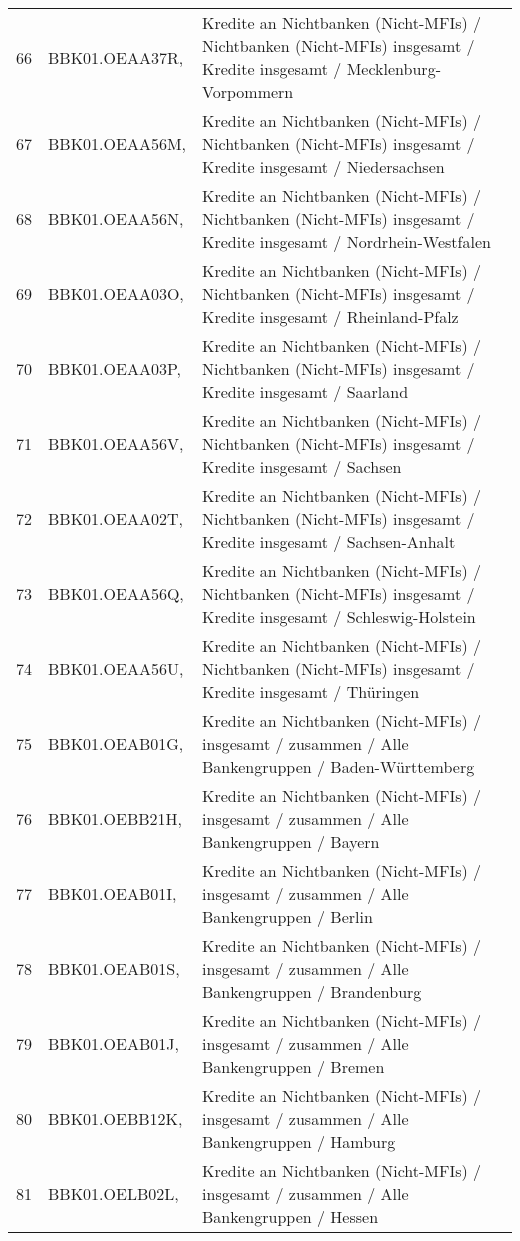 \begin{table}[ht]
\begin{tabular}{rll}
  66 & BBK01.OEAA37R, & Kredite an Nichtbanken (Nicht-MFIs) / Nichtbanken (Nicht-MFIs) insgesamt / Kredite insgesamt / Mecklenburg-Vorpommern \\ 
  67 & BBK01.OEAA56M, & Kredite an Nichtbanken (Nicht-MFIs) / Nichtbanken (Nicht-MFIs) insgesamt / Kredite insgesamt / Niedersachsen \\ 
  68 & BBK01.OEAA56N, & Kredite an Nichtbanken (Nicht-MFIs) / Nichtbanken (Nicht-MFIs) insgesamt / Kredite insgesamt / Nordrhein-Westfalen \\ 
  69 & BBK01.OEAA03O, & Kredite an Nichtbanken (Nicht-MFIs) / Nichtbanken (Nicht-MFIs) insgesamt / Kredite insgesamt / Rheinland-Pfalz \\ 
  70 & BBK01.OEAA03P, & Kredite an Nichtbanken (Nicht-MFIs) / Nichtbanken (Nicht-MFIs) insgesamt / Kredite insgesamt / Saarland \\ 
  71 & BBK01.OEAA56V, & Kredite an Nichtbanken (Nicht-MFIs) / Nichtbanken (Nicht-MFIs) insgesamt / Kredite insgesamt / Sachsen \\ 
  72 & BBK01.OEAA02T, & Kredite an Nichtbanken (Nicht-MFIs) / Nichtbanken (Nicht-MFIs) insgesamt / Kredite insgesamt / Sachsen-Anhalt \\ 
  73 & BBK01.OEAA56Q, & Kredite an Nichtbanken (Nicht-MFIs) / Nichtbanken (Nicht-MFIs) insgesamt / Kredite insgesamt / Schleswig-Holstein \\ 
  74 & BBK01.OEAA56U, & Kredite an Nichtbanken (Nicht-MFIs) / Nichtbanken (Nicht-MFIs) insgesamt / Kredite insgesamt / Thüringen \\ 
  75 & BBK01.OEAB01G, & Kredite an Nichtbanken (Nicht-MFIs) / insgesamt / zusammen / Alle Bankengruppen / Baden-Württemberg \\ 
  76 & BBK01.OEBB21H, & Kredite an Nichtbanken (Nicht-MFIs) / insgesamt / zusammen / Alle Bankengruppen / Bayern \\ 
  77 & BBK01.OEAB01I, & Kredite an Nichtbanken (Nicht-MFIs) / insgesamt / zusammen / Alle Bankengruppen / Berlin \\ 
  78 & BBK01.OEAB01S, & Kredite an Nichtbanken (Nicht-MFIs) / insgesamt / zusammen / Alle Bankengruppen / Brandenburg \\ 
  79 & BBK01.OEAB01J, & Kredite an Nichtbanken (Nicht-MFIs) / insgesamt / zusammen / Alle Bankengruppen / Bremen \\ 
  80 & BBK01.OEBB12K, & Kredite an Nichtbanken (Nicht-MFIs) / insgesamt / zusammen / Alle Bankengruppen / Hamburg \\ 
  81 & BBK01.OELB02L, & Kredite an Nichtbanken (Nicht-MFIs) / insgesamt / zusammen / Alle Bankengruppen / Hessen \\ 

\end{tabular}
\end{table}
